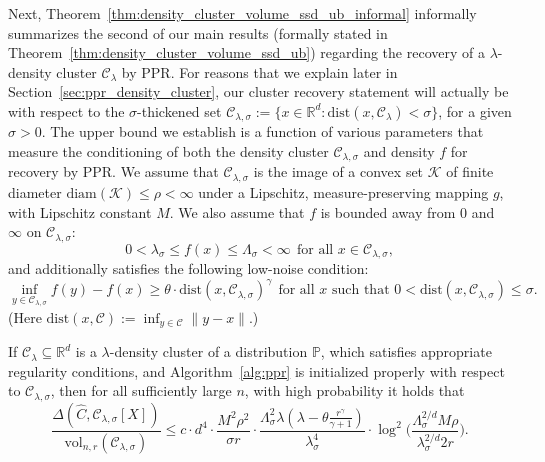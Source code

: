 \documentclass[twoside,11pt]{article}
\newcommand{\Reals}{\mathbb{R}}
\newcommand{\1}{\mathbf{1}}
\newcommand{\Rd}{\Reals^d}
\newcommand{\mc}[1]{\mathcal{#1}}
\newcommand{\Pbb}{\mathbb{P}}
\newcommand{\wh}[1]{\widehat{#1}}
\newcommand{\dist}{\mathrm{dist}}
\newcommand{\vol}{\mathrm{vol}}
\begin{document}
Next, Theorem~\ref{thm:density_cluster_volume_ssd_ub_informal} informally summarizes the second of our main results (formally stated in Theorem~\ref{thm:density_cluster_volume_ssd_ub}) regarding the recovery of a $\lambda$-density cluster $\mc{C}_{\lambda}$ by PPR. For reasons that we explain later in Section~\ref{sec:ppr_density_cluster}, our cluster recovery statement will actually be with respect to the $\sigma$-thickened set $\mc{C}_{\lambda,\sigma} := \{x \in \Rd: \mathrm{dist}(x,\mc{C}_{\lambda}) < \sigma\}$, for a given $\sigma > 0$. The upper bound we establish is a function of various parameters that measure the conditioning of both the density cluster $\mc{C}_{\lambda,\sigma}$ and density $f$ for recovery by PPR. We assume that $\mc{C}_{\lambda,\sigma}$ is the image of a convex set $\mc{K}$ of finite diameter $\mathrm{diam}(\mc{K}) \leq \rho < \infty$ under a Lipschitz, measure-preserving mapping $g$, with Lipschitz constant $M$. We also assume that $f$ is bounded away from $0$ and $\infty$ on $\mc{C}_{\lambda,\sigma}$:
\begin{equation*}
0 < \lambda_{\sigma} \leq f(x) \leq \Lambda_{\sigma} < \infty~~\text{for all $x \in \mc{C}_{\lambda,\sigma}$},
\end{equation*}
and additionally satisfies the following low-noise condition:
\begin{equation*}
\inf_{y \in \mc{C}_{\lambda,\sigma}} f(y) - f(x) \geq  \theta \cdot \dist(x, \mc{C}_{\lambda,\sigma})^{\gamma}~~\text{for all $x$ such that $0 < \dist(x,\mc{C}_{\lambda,\sigma}) \leq \sigma$.}
\end{equation*}
(Here $\dist(x,\mc{C}) := \inf_{y \in \mc{C}} \|y - x\|$.) 
\begin{theorem}[Informal]
	\label{thm:density_cluster_volume_ssd_ub_informal}
	If $\mc{C}_{\lambda} \subseteq \Rd$ is a $\lambda$-density cluster of a distribution $\Pbb$, which satisfies appropriate regularity conditions, and Algorithm~\ref{alg:ppr} is initialized properly with respect to $\mc{C}_{\lambda,\sigma}$, then for all sufficiently large $n$, with high probability it holds that
	\begin{equation*}
	\frac{\Delta(\wh{C},\mc{C}_{\lambda,\sigma}[X])}{\vol_{n,r}(\mc{C}_{\lambda,\sigma})} \leq c \cdot d^4 \cdot \frac{M^2\rho^2}{\sigma r} \cdot \frac{\Lambda_{\sigma}^2 \lambda (\lambda - \theta \frac{r^{\gamma}}{\gamma + 1})}{\lambda_{\sigma}^4} \cdot \log^2\biggl(\frac{\Lambda_{\sigma}^{2/d} M\rho}{\lambda_{\sigma}^{2/d}2r}\biggr).
	\end{equation*}
\end{theorem}
\end{document}
